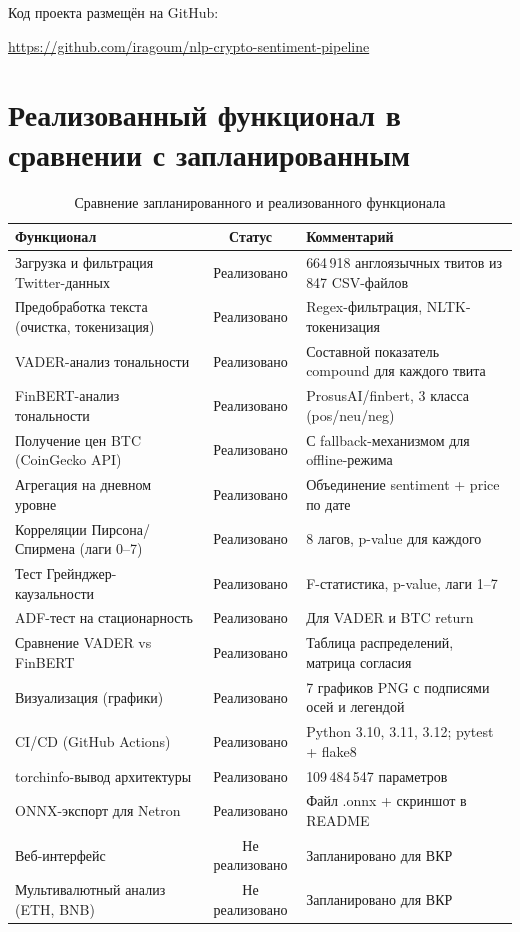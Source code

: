 \documentclass[a4paper,12pt]{article}
\begin{document}
Код проекта размещён на GitHub:

\begin{center}
\url{https://github.com/iragoum/nlp-crypto-sentiment-pipeline}
\end{center}


\section{Реализованный функционал в сравнении с запланированным}

\begin{table}[H]
\centering
\caption{Сравнение запланированного и реализованного функционала}
\label{tab:planned_vs_done}
\begin{tabularx}{\textwidth}{|p{5.5cm}|c|X|}
\hline
\textbf{Функционал} & \textbf{Статус} & \textbf{Комментарий} \\
\hline
Загрузка и фильтрация Twitter-данных & Реализовано & 664\,918 англоязычных твитов из 847 CSV-файлов \\
\hline
Предобработка текста (очистка, токенизация) & Реализовано & Regex-фильтрация, NLTK-токенизация \\
\hline
VADER-анализ тональности & Реализовано & Составной показатель compound для каждого твита \\
\hline
FinBERT-анализ тональности & Реализовано & ProsusAI/finbert, 3 класса (pos/neu/neg) \\
\hline
Получение цен BTC (CoinGecko API) & Реализовано & С fallback-механизмом для offline-режима \\
\hline
Агрегация на дневном уровне & Реализовано & Объединение sentiment + price по дате \\
\hline
Корреляции Пирсона/Спирмена (лаги 0--7) & Реализовано & 8 лагов, p-value для каждого \\
\hline
Тест Грейнджер-каузальности & Реализовано & F-статистика, p-value, лаги 1--7 \\
\hline
ADF-тест на стационарность & Реализовано & Для VADER и BTC return \\
\hline
Сравнение VADER vs FinBERT & Реализовано & Таблица распределений, матрица согласия \\
\hline
Визуализация (графики) & Реализовано & 7 графиков PNG с подписями осей и легендой \\
\hline
CI/CD (GitHub Actions) & Реализовано & Python 3.10, 3.11, 3.12; pytest + flake8 \\
\hline
torchinfo-вывод архитектуры & Реализовано & 109\,484\,547 параметров \\
\hline
ONNX-экспорт для Netron & Реализовано & Файл .onnx + скриншот в README \\
\hline
Веб-интерфейс & Не реализовано & Запланировано для ВКР \\
\hline
Мультивалютный анализ (ETH, BNB) & Не реализовано & Запланировано для ВКР \\
\hline
\end{tabularx}
\end{table}
\end{document}

